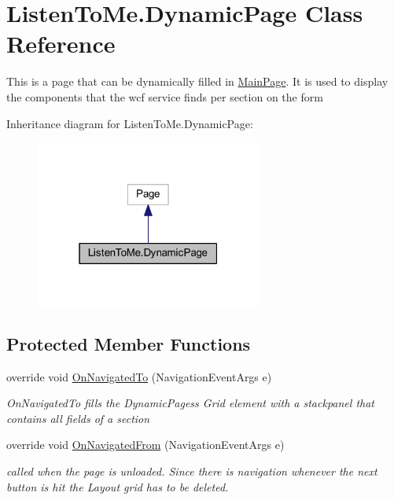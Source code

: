 \hypertarget{class_listen_to_me_1_1_dynamic_page}{}\section{Listen\+To\+Me.\+Dynamic\+Page Class Reference}
\label{class_listen_to_me_1_1_dynamic_page}


This is a page that can be dynamically filled in \hyperlink{class_listen_to_me_1_1_main_page}{Main\+Page}. It is used to display the components that the wcf service finds per section on the form  




Inheritance diagram for Listen\+To\+Me.\+Dynamic\+Page\+:\nopagebreak
\begin{figure}[H]
\begin{center}
\leavevmode
\includegraphics[width=211pt]{class_listen_to_me_1_1_dynamic_page__inherit__graph}
\end{center}
\end{figure}
\subsection*{Protected Member Functions}
\begin{DoxyCompactItemize}
\item 
override void \hyperlink{class_listen_to_me_1_1_dynamic_page_abe7cf843906f8a930d2bdd2ade17ea0b}{On\+Navigated\+To} (Navigation\+Event\+Args e)
\begin{DoxyCompactList}\small\item\em On\+Navigated\+To fills the Dynamic\+Pages\textquotesingle{}s Grid element with a stackpanel that contains all fields of a section \end{DoxyCompactList}\item 
override void \hyperlink{class_listen_to_me_1_1_dynamic_page_a042e3936e2668147cd280d2428ef793b}{On\+Navigated\+From} (Navigation\+Event\+Args e)
\begin{DoxyCompactList}\small\item\em called when the page is unloaded. Since there is navigation whenever the \textquotesingle{}next\textquotesingle{} button is hit the Layout grid has to be deleted. \end{DoxyCompactList}\end{DoxyCompactItemize}


